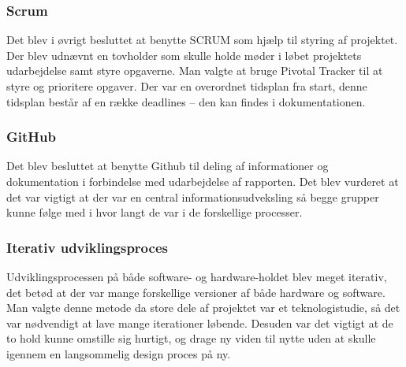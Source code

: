 \subsubsection{Scrum}
Det blev i øvrigt besluttet at benytte SCRUM som hjælp til styring af projektet. Der blev udnævnt en tovholder som skulle holde møder i løbet projektets udarbejdelse samt styre opgaverne. Man valgte at bruge Pivotal Tracker \cite{tracker}  til at styre og prioritere opgaver. Der var en overordnet tidsplan fra start, denne tidsplan består af en række deadlines – den kan findes i dokumentationen.
\subsubsection{GitHub}
Det blev besluttet at benytte Github til deling af informationer og dokumentation i forbindelse med udarbejdelse af rapporten. Det blev vurderet at det var vigtigt at der var en central informationsudveksling så begge grupper kunne følge med i hvor langt de var i de forskellige processer. 
\subsubsection{Iterativ udviklingsproces}
Udviklingsprocessen på både software- og hardware-holdet blev meget iterativ, det betød at der var mange forskellige versioner af både hardware og software. Man valgte denne metode da store dele af projektet var et teknologistudie, så det var nødvendigt at lave mange iterationer løbende. Desuden var det vigtigt at de to hold kunne omstille sig hurtigt, og drage ny viden til nytte uden at skulle igennem en langsommelig design proces på ny.
